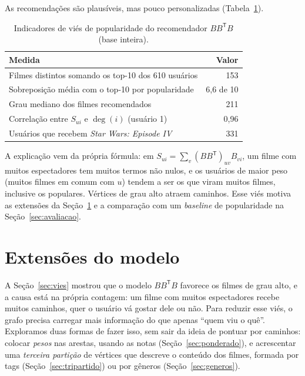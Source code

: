 \documentclass[12pt,a4paper]{article}
\theoremstyle{definition}
\begin{document}
As recomendações são plausíveis, mas pouco personalizadas
(Tabela~\ref{tab:vies}).

\begin{table}[ht]
\centering
\begin{tabular}{lr}
\toprule
Medida & Valor \\
\midrule
Filmes distintos somando os top-10 dos 610 usuários & 153 \\
Sobreposição média com o top-10 por popularidade & 6{,}6 de 10 \\
Grau mediano dos filmes recomendados & 211 \\
Correlação entre $S_{ui}$ e $\deg(i)$ (usuário 1) & 0{,}96 \\
Usuários que recebem \emph{Star Wars: Episode IV} & 331 \\
\bottomrule
\end{tabular}
\caption{Indicadores de viés de popularidade do recomendador
$BB^{\mathsf T}B$ (base inteira).}
\label{tab:vies}
\end{table}

A explicação vem da própria fórmula: em
$S_{ui} = \sum_v (BB^{\mathsf T})_{uv} B_{vi}$, um filme com muitos
espectadores tem muitos termos não nulos, e os usuários de maior peso
(muitos filmes em comum com $u$) tendem a ser os que viram muitos filmes,
inclusive os populares. Vértices de grau alto atraem caminhos. Esse viés
motiva as extensões da Seção~\ref{sec:extensoes} e a comparação com um
\emph{baseline} de popularidade na Seção~\ref{sec:avaliacao}.

\section{Extensões do modelo}\label{sec:extensoes}

A Seção~\ref{sec:vies} mostrou que o modelo $BB^{\mathsf T}B$ favorece
os filmes de grau alto, e a causa está na própria contagem: um filme
com muitos espectadores recebe muitos caminhos, quer o usuário vá
gostar dele ou não. Para reduzir esse viés, o grafo precisa carregar
mais informação do que apenas ``quem viu o quê''. Exploramos duas formas
de fazer isso, sem sair da ideia de pontuar por caminhos: colocar
\emph{pesos} nas arestas, usando as notas
(Seção~\ref{sec:ponderado}), e acrescentar uma \emph{terceira partição}
de vértices que descreve o conteúdo dos filmes, formada por tags
(Seção~\ref{sec:tripartido}) ou por gêneros
(Seção~\ref{sec:generos}).
\end{document}
